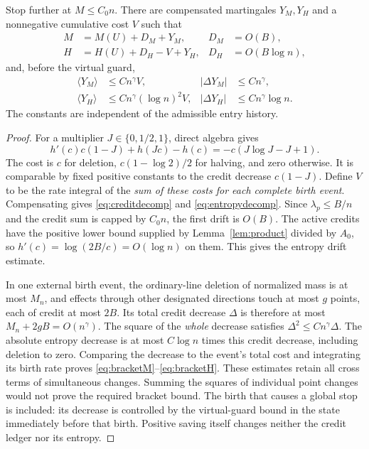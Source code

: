 \begin{lemma}\label{lem:entropy}
Stop further at \(M\le C_0n\). There are compensated martingales
\(Y_M,Y_H\) and a nonnegative cumulative cost \(V\) such that
\begin{align}
 M&=M(U)+D_M+Y_M,&D_M&=O(B),\label{eq:creditdecomp}\\
 H&=H(U)+D_H-V+Y_H,&D_H&=O(B\log n),\label{eq:entropydecomp}
\end{align}
and, before the virtual guard,
\begin{align}
 \langle Y_M\rangle&\le C n^\gamma V,
 &|\Delta Y_M|&\le C n^\gamma,\label{eq:bracketM}\\
 \langle Y_H\rangle&\le C n^\gamma(\log n)^2V,
 &|\Delta Y_H|&\le C n^\gamma\log n.\label{eq:bracketH}
\end{align}
The constants are independent of the admissible entry history.
\end{lemma}
\begin{proof}
For a multiplier \(J\in\{0,1/2,1\}\), direct algebra gives
\[
 h'(c)c(1-J)+h(Jc)-h(c)=-c(J\log J-J+1).
\]
The cost is \(c\) for deletion, \(c(1-\log2)/2\) for halving,
and zero otherwise. It is comparable by fixed positive constants
to the credit decrease \(c(1-J)\). Define \(V\) to be the rate
integral of the \emph{sum of these costs for each complete birth
event}. Compensating gives \eqref{eq:creditdecomp} and
\eqref{eq:entropydecomp}. Since \(\lambda_p\le B/n\) and the
credit sum is capped by \(C_0n\), the first drift is \(O(B)\).
The active credits have the positive lower bound supplied by
Lemma~\ref{lem:product} divided by \(A_0\), so
\(h'(c)=\log(2B/c)=O(\log n)\) on them. This gives the entropy
drift estimate.

In one external birth event, the ordinary-line deletion of normalized
mass is at most \(M_n\), and effects through other designated
directions touch at most \(g\) points, each of credit at most \(2B\).
Its total credit decrease \(\Delta\) is therefore at most
\(M_n+2gB=O(n^\gamma)\). The square of the \emph{whole} decrease
satisfies \(\Delta^2\le C n^\gamma\Delta\).
The absolute entropy decrease is at most \(C\log n\) times this
credit decrease, including deletion to zero. Comparing the decrease
to the event's total cost and integrating its birth rate proves
\eqref{eq:bracketM}--\eqref{eq:bracketH}. These estimates retain
all cross terms of simultaneous changes. Summing the squares of
individual point changes would not prove the required bracket bound.
The birth that causes a global stop is included: its decrease is
controlled by the virtual-guard bound in the state immediately
before that birth. Positive saving itself changes neither the
credit ledger nor its entropy.
\end{proof}

